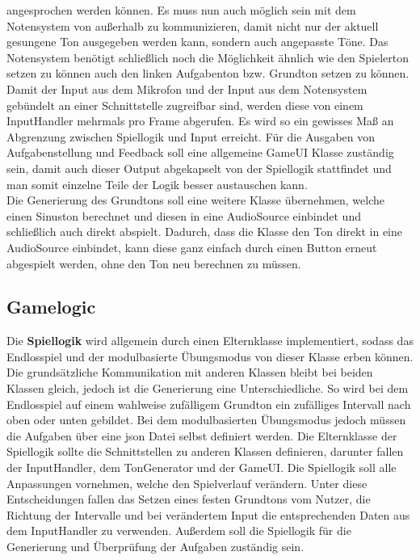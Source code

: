 angesprochen werden können. Es muss nun auch möglich sein mit dem Notensystem von außerhalb zu kommunizieren, damit nicht nur der aktuell gesungene Ton ausgegeben werden kann, sondern auch angepasste Töne. Das Notensystem benötigt schließlich noch die Möglichkeit ähnlich wie den Spielerton setzen zu können auch den linken Aufgabenton bzw. Grundton setzen zu können.\\
Damit der Input aus dem Mikrofon und der Input aus dem Notensystem gebündelt an einer Schnittstelle zugreifbar sind, werden diese von einem InputHandler mehrmals pro Frame abgerufen. Es wird so ein gewisses Maß an Abgrenzung zwischen Spiellogik und Input erreicht. Für die Ausgaben von Aufgabenstellung und Feedback soll eine allgemeine GameUI Klasse zuständig sein, damit auch dieser Output abgekapselt von der Spiellogik stattfindet und man somit einzelne Teile der Logik besser austauschen kann. \\
Die Generierung des Grundtons soll eine weitere Klasse übernehmen, welche einen Sinuston berechnet und diesen in eine AudioSource einbindet und schließlich auch direkt abspielt. Dadurch, dass die Klasse den Ton direkt in eine AudioSource einbindet, kann diese ganz einfach durch einen Button erneut abgespielt werden, ohne den Ton neu berechnen zu müssen.\\

\subsection{Gamelogic}
Die \textbf{Spiellogik} wird allgemein durch einen Elternklasse implementiert, sodass das Endlosspiel und der modulbasierte Übungsmodus von dieser Klasse erben können. Die grundsätzliche Kommunikation mit anderen Klassen bleibt bei beiden Klassen gleich, jedoch ist die Generierung eine Unterschiedliche. So wird bei dem Endlosspiel auf einem wahlweise zufälligem Grundton ein zufälliges Intervall nach oben oder unten gebildet. Bei dem modulbasierten Übungsmodus jedoch müssen die Aufgaben über eine json Datei selbst definiert werden. Die Elternklasse der Spiellogik sollte die Schnittstellen zu anderen Klassen definieren, darunter fallen der InputHandler, dem TonGenerator und der GameUI. Die Spiellogik soll alle Anpassungen vornehmen, welche den Spielverlauf verändern. Unter diese Entscheidungen fallen das Setzen eines festen Grundtons vom Nutzer, die Richtung der Intervalle und bei verändertem Input die entsprechenden Daten aus dem InputHandler zu verwenden. Außerdem soll die Spiellogik für die Generierung und Überprüfung der Aufgaben zuständig sein. \\

